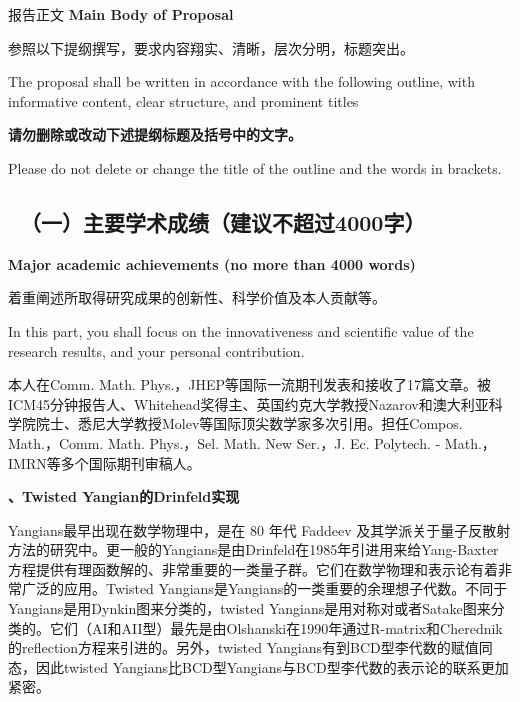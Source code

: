\documentclass[12pt,UTF8,AutoFakeBold=4,a4paper]{ctexart}
\begin{document}
\begin{center}
{\sanhao {} 报告正文 
\bfseries {} Main Body of Proposal}
\end{center}

{\sihao \kaishu  
参照以下提纲撰写，要求内容翔实、清晰，层次分明，标题突出。}

{\sihao {} The proposal shall be written in accordance 
with the following outline, with informative content, clear structure, 
and prominent titles}

{\sihao \kaishu \color{MsBlue} \bfseries 请勿删除或改动下述提纲标题及括号中的文字。}

{\sihao \color{MsBlue}  Please do not delete or 
change the title of the outline and the words in brackets.}



{\color{MsBlue} \subsection{\sihao \kaishu \quad \ 
\textbf{（一）主要学术成绩}（建议不超过4000字）}}

{\color{MsBlue} \xiaosihao {} 
\textbf{Major academic achievements (no more than 4000 words)}}

{\sihao \kaishu \color{MsBlue} 着重阐述所取得研究成果的创新性、科学价值及本人贡献等。}

{\color{MsBlue} \xiaosihao {} In this part, you shall 
focus on the innovativeness and scientific value of the research results, 
and your personal contribution.}

% 
% 


本人在Comm. Math. Phys.，JHEP等国际一流期刊发表和接收了17篇文章。被ICM45分钟报告人、Whitehead奖得主、英国约克大学教授Nazarov和澳大利亚科学院院士、悉尼大学教授Molev等国际顶尖数学家多次引用。担任Compos. Math.，Comm. Math. Phys.，Sel. Math. New Ser.，J. Ec. Polytech. - Math.，IMRN等多个国际期刊审稿人。

\medskip

\textbf{、Twisted Yangian的Drinfeld实现}

Yangians最早出现在数学物理中，是在 80 年代 Faddeev 及其学派关于量子反散射方法的研究中。更一般的Yangians是由Drinfeld在1985年引进用来给Yang-Baxter方程提供有理函数解的、非常重要的一类量子群。它们在数学物理和表示论有着非常广泛的应用。Twisted Yangians是Yangians的一类重要的余理想子代数。不同于Yangians是用Dynkin图来分类的，twisted Yangians是用对称对或者Satake图来分类的。它们（AI和AII型）最先是由Olshanski在1990年通过R-matrix和Cherednik的reflection方程来引进的。另外，twisted Yangians有到BCD型李代数的赋值同态，因此twisted Yangians比BCD型Yangians与BCD型李代数的表示论的联系更加紧密。
\end{document}
